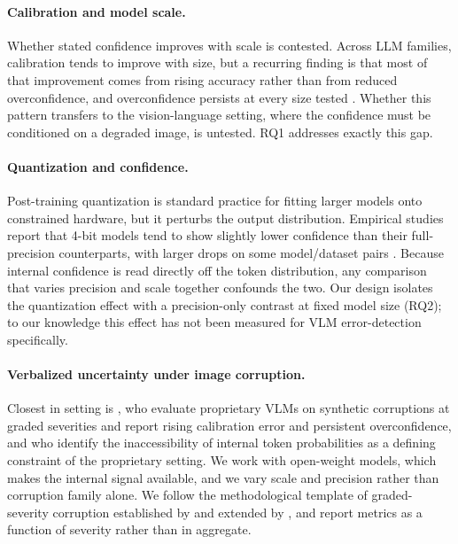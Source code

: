 \documentclass[11pt]{article}
\begin{document}
\paragraph{Calibration and model scale.}
Whether stated confidence improves with scale is contested. Across LLM families,
calibration tends to improve with size, but a recurring finding is that most of
that improvement comes from rising accuracy rather than from reduced
overconfidence, and overconfidence persists at every size tested
\citep{xiong2024llms}. Whether this pattern transfers to the vision-language
setting, where the confidence must be conditioned on a degraded image, is
untested. RQ1 addresses exactly this gap.

\paragraph{Quantization and confidence.}
Post-training quantization is standard practice for fitting larger models onto
constrained hardware, but it perturbs the output distribution. Empirical studies
report that 4-bit models tend to show slightly lower confidence than their
full-precision counterparts, with larger drops on some model/dataset pairs
\citep{quant2025interpreting}. Because internal confidence is read directly off
the token distribution, any comparison that varies precision and scale together
confounds the two. Our design isolates the quantization effect with a
precision-only contrast at fixed model size (RQ2); to our knowledge this effect
has not been measured for VLM error-detection specifically.

\paragraph{Verbalized uncertainty under image corruption.}
Closest in setting is \citet{borszukovszki2025know}, who evaluate proprietary
VLMs on synthetic corruptions at graded severities and report rising calibration
error and persistent overconfidence, and who identify the inaccessibility of
internal token probabilities as a defining constraint of the proprietary setting.
We work with open-weight models, which makes the internal signal available, and
we vary scale and precision rather than corruption family alone. We follow the
methodological template of graded-severity corruption established by
\citet{hendrycks2019benchmarking} and extended by \citet{michaelis2019benchmarking},
and report metrics as a function of severity rather than in aggregate.
\end{document}
